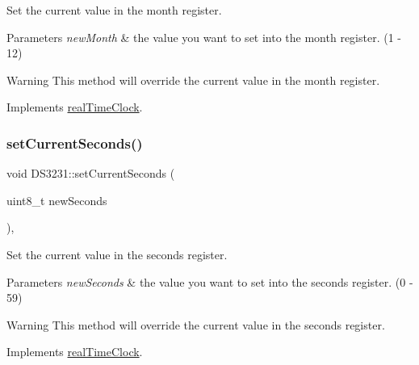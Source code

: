 Set the current value in the month register. 


\begin{DoxyParams}{Parameters}
{\em new\+Month} & the value you want to set into the month register. (1 -\/ 12) \\
\hline
\end{DoxyParams}
\begin{DoxyWarning}{Warning}
This method will override the current value in the month register. 
\end{DoxyWarning}


Implements \mbox{\hyperlink{classreal_time_clock_a2edeb084630a78309bc574eceaf5d6ae}{real\+Time\+Clock}}.

\mbox{\label{class_d_s3231_ac73512cc6c2a37ffb21bee74ea835a09}} 
\subsubsection{\texorpdfstring{set\+Current\+Seconds()}{setCurrentSeconds()}}
{\footnotesize\ttfamily void D\+S3231\+::set\+Current\+Seconds (\begin{DoxyParamCaption}\item[{uint8\+\_\+t}]{new\+Seconds }\end{DoxyParamCaption})\hspace{0.3cm}{\ttfamily [override]}, {\ttfamily [virtual]}}



Set the current value in the seconds register. 


\begin{DoxyParams}{Parameters}
{\em new\+Seconds} & the value you want to set into the seconds register. (0 -\/ 59) \\
\hline
\end{DoxyParams}
\begin{DoxyWarning}{Warning}
This method will override the current value in the seconds register. 
\end{DoxyWarning}


Implements \mbox{\hyperlink{classreal_time_clock_a463a64d4861c75e26a80712e1dd50e6b}{real\+Time\+Clock}}.

\mbox{\label{class_d_s3231_a59a60a725581bc8e5dcf857ea52c6281}} 
